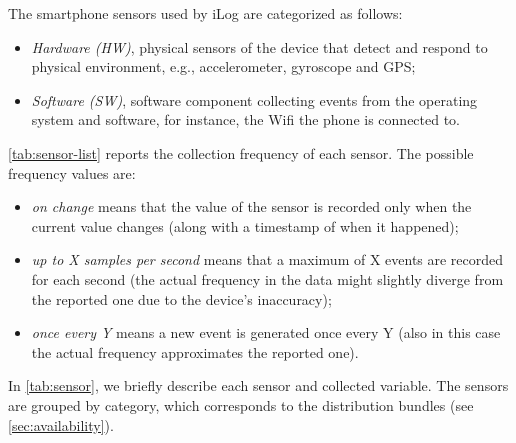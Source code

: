 The smartphone sensors used by iLog are categorized as follows:
%
\begin{itemize}
    \item \textit{Hardware (HW)}, physical sensors of the device that detect and respond to physical environment, e.g., accelerometer, gyroscope and GPS;
    \item \textit{Software (SW)}, software component collecting events from the operating system and software, for instance, the Wifi the phone is connected to.
\end{itemize}
%
\cref{tab:sensor-list} reports the collection frequency of each sensor. The possible frequency values are:
%
\begin{itemize}
    \item \textit{on change} means that the value of the sensor is recorded only when the current value changes (along with a timestamp of when it happened);
    \item\textit{up to X samples per second} means that a maximum of X events are recorded for each second (the actual frequency in the data might slightly diverge from the reported one due to the device's inaccuracy);
    \item \textit{once every Y} means a new event is generated once every Y (also in this case the actual frequency approximates the reported one).
\end{itemize}
In \cref{tab:sensor}, we briefly describe each sensor and collected variable. The sensors are grouped by category, which corresponds to the distribution bundles (see \cref{sec:availability}).

